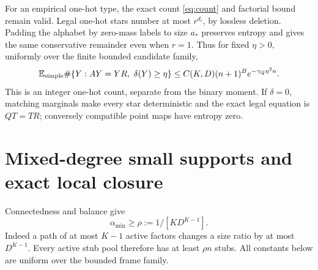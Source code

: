 \documentclass[11pt]{article}
\newcommand{\E}{\mathbb E}
\begin{document}
For an empirical one-hot type, the exact count \eqref{eq:count} and
factorial bound remain valid. Legal one-hot stars number at most $r^{d_i}$,
by lossless deletion. Padding the alphabet by zero-mass labels to size
$a_*$ preserves entropy and gives the same conservative remainder even
when $r=1$. Thus for fixed $\eta>0$, uniformly over the finite
bounded candidate family,
\begin{equation}\label{eq:macro}
 \E_{\rm simple}\#\{Y:AY=YR,\ \delta(Y)\ge\eta\}
 \le C(K,D)(n+1)^B e^{-\gamma_Q\eta^2 n}.
\end{equation}
This is an integer one-hot count, separate from the binary moment.
If $\delta=0$, matching marginals make every star deterministic and
the exact legal equation is $QT=TR$; conversely compatible point maps
have entropy zero.

\section{Mixed-degree small supports and exact local closure}
Connectedness and balance give
\[
 \alpha_{\min}\ge\rho:=1/[K D^{K-1}].
\]
Indeed a path of at most $K-1$ active factors changes a size ratio by
at most $D^{K-1}$. Every active stub pool therefore has at least $\rho n$
stubs. All constants below are uniform over the bounded frame family.
\end{document}
